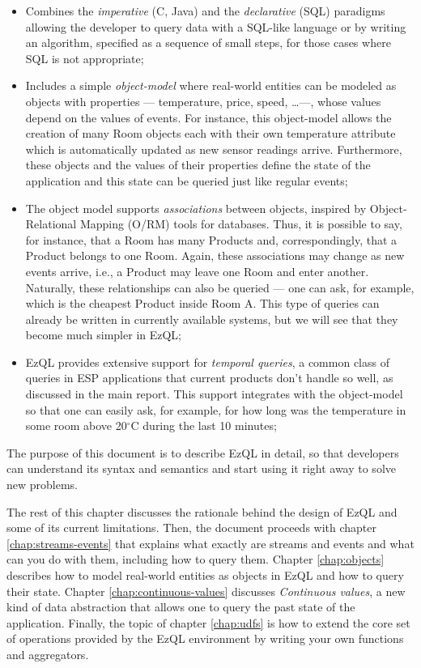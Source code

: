 \documentclass{report}
\begin{document}
\begin{itemize}
\item Combines the \emph{imperative} (C, Java) and the
  \emph{declarative} (SQL) paradigms allowing the developer to query
  data with a SQL-like language or by writing an algorithm, specified
  as a sequence of small steps, for those cases where SQL is not
  appropriate;
\item Includes a simple \emph{object-model} where real-world entities
  can be modeled as objects with properties --- temperature, price,
  speed, \ldots ---, whose values depend on the values of events. For
  instance, this object-model allows the creation of many Room objects
  each with their own temperature attribute which is automatically
  updated as new sensor readings arrive. Furthermore, these objects
  and the values of their properties define the state of the
  application and this state can be queried just like regular events;
\item The object model supports \emph{associations} between objects,
  inspired by Object-Relational Mapping (O/RM) tools for
  databases. Thus, it is possible to say, for instance, that a Room
  has many Products and, correspondingly, that a Product belongs to
  one Room. Again, these associations may change as new events arrive,
  i.e., a Product may leave one Room and enter another. Naturally,
  these relationships can also be queried --- one can ask, for
  example, which is the cheapest Product inside Room A. This type of
  queries can already be written in currently available systems, but
  we will see that they become much simpler in EzQL;
\item EzQL provides extensive support for \emph{temporal queries}, a
  common class of queries in ESP applications that current products
  don't handle so well, as discussed in the main report. This support
  integrates with the object-model so that one can easily ask, for
  example, for how long was the temperature in some room above
  20$^{\circ}$C during the last 10 minutes;
\end{itemize}

The purpose of this document is to describe EzQL in detail, so that
developers can understand its syntax and semantics and start using it
right away to solve new problems.

The rest of this chapter discusses the rationale behind the design of
EzQL and some of its current limitations. Then, the document proceeds
with chapter \ref{chap:streams-events} that explains what exactly are
streams and events and what can you do with them, including how to
query them. Chapter \ref{chap:objects} describes how to model
real-world entities as objects in EzQL and how to query their
state. Chapter \ref{chap:continuous-values} discusses \emph{Continuous
  values}, a new kind of data abstraction that allows one to query the
past state of the application. Finally, the topic of chapter
\ref{chap:udfs} is how to extend the core set of operations provided
by the EzQL environment by writing your own functions and aggregators.
\end{document}
